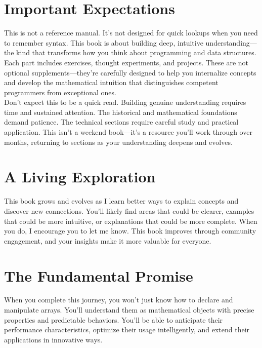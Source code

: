 \section*{Important Expectations}

This is not a reference manual. It's not designed for quick lookups when you need to remember syntax. This book is about building deep, intuitive understanding—the kind that transforms how you think about programming and data structures.\\

Each part includes exercises, thought experiments, and projects. These are not optional supplements—they're carefully designed to help you internalize concepts and develop the mathematical intuition that distinguishes competent programmers from exceptional ones.\\

Don't expect this to be a quick read. Building genuine understanding requires time and sustained attention. The historical and mathematical foundations demand patience. The technical sections require careful study and practical application. This isn't a weekend book—it's a resource you'll work through over months, returning to sections as your understanding deepens and evolves.\\

\section*{A Living Exploration}

This book grows and evolves as I learn better ways to explain concepts and discover new connections. You'll likely find areas that could be clearer, examples that could be more intuitive, or explanations that could be more complete. When you do, I encourage you to let me know. This book improves through community engagement, and your insights make it more valuable for everyone.\\

\section*{The Fundamental Promise}

When you complete this journey, you won't just know how to declare and manipulate arrays. You'll understand them as mathematical objects with precise properties and predictable behaviors. You'll be able to anticipate their performance characteristics, optimize their usage intelligently, and extend their applications in innovative ways.\\

